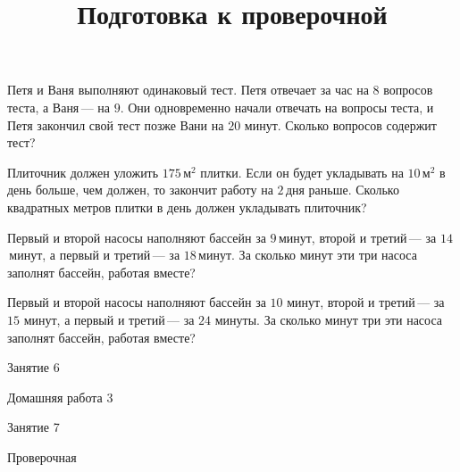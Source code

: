 \begin{class}[number=5]
\begin{listofex}
		\item Петя и Ваня выполняют одинаковый тест. Петя отвечает за час на \(8\) вопросов теста, а Ваня --- на \(9\). Они одновременно начали отвечать на вопросы теста, и Петя закончил свой тест позже Вани на \(20\) минут. Сколько вопросов содержит тест?
		\item Плиточник должен уложить \(175\) м\(^2\) плитки. Если он будет укладывать на \(10\) м\(^2\) в день больше, чем должен, то закончит работу на \(2\) дня раньше. Сколько квадратных метров плитки в день должен укладывать плиточник?
		\item Первый и второй насосы наполняют бассейн за \(9\) минут, второй и третий --- за \(14\) минут, а первый и третий --- за \(18\) минут. За сколько минут эти три насоса заполнят бассейн, работая вместе?
		\item Первый и второй насосы наполняют бассейн за \(10\) минут, второй и третий --- за \(15\) минут, а первый и третий --- за \(24\) минуты. За сколько минут три эти насоса заполнят бассейн, работая вместе?
	\end{listofex}
\end{class}

\begin{class}[number=6]
	\begin{listofex}
		\item Занятие 6
	\end{listofex}
\end{class}

\begin{homework}[number=3]
	\begin{listofex}
		\item Домашняя работа 3
	\end{listofex}
\end{homework}

\begin{class}[number=7]
	\title{Подготовка к проверочной}
	\begin{listofex}
		\item Занятие 7
	\end{listofex}
\end{class}

\begin{exam}
	\begin{listofex}
		\item Проверочная
	\end{listofex}
\end{exam}
